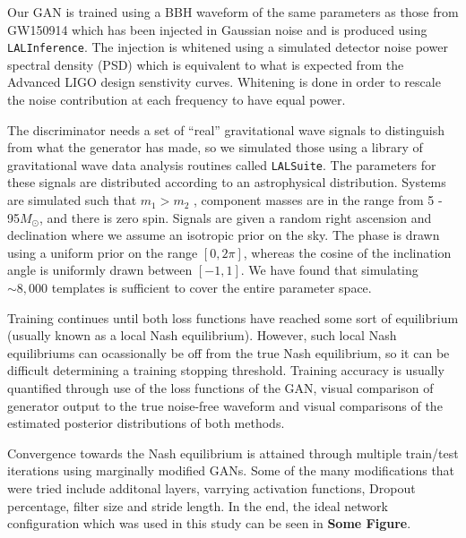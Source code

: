 \documentclass[%
showpacs,
 amsmath,amssymb,
 aps,
 twocolumn,
 prl,
 reprint,
floatfix,
]{revtex4-1}
\begin{document}
%
Our GAN is trained using a BBH waveform of the same parameters as those from
GW150914 which has been injected in Gaussian noise and is produced using
\texttt{LALInference}. The injection is whitened using a simulated detector
noise power spectral density (PSD) which is equivalent to what is expected from
the Advanced LIGO design senstivity curves. Whitening is done in order to
rescale the noise contribution at each frequency to have equal power.

%
The discriminator needs a set of ``real'' gravitational wave signals to
distinguish from what the generator has made, so we simulated those using a
library of gravitational wave data analysis routines called \texttt{LALSuite}.
The parameters for these signals are distributed according to an astrophysical
distribution. Systems are simulated such that $m_{1} > m_{2}$ , component
masses are in the range from 5 - 95\(M_\odot\), and there is zero spin. Signals
are given a random right ascension and declination where we assume an isotropic
prior on the sky. The phase is drawn using a uniform prior on the range
$[0,2\pi]$, whereas the cosine of the inclination angle is uniformly drawn
between $[-1,1]$. We have found that simulating $\sim8,000$ templates is
sufficient to cover the entire parameter space. 

%
Training continues until both loss functions have reached some sort of
equilibrium (usually known as a local Nash equilibrium). However, such local
Nash equilibriums can ocassionally be off from the true Nash equilibrium, so it
can be difficult determining a training stopping threshold. Training accuracy
is usually quantified through use of the loss functions of the GAN, visual
comparison of generator output to the true noise-free waveform and visual
comparisons of the estimated posterior distributions of both methods.

Convergence towards the Nash equilibrium is attained through multiple
train/test iterations using marginally modified GANs. Some of the many
modifications that were tried include additonal layers, varrying activation
functions, Dropout percentage, filter size and stride length. In the end, the
ideal network configuration which was used in this study can be seen in
\textbf{Some Figure}. 
\end{document}
